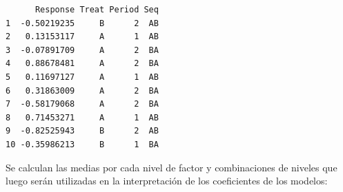 \documentclass[
  12pt,
  a4paper,
  extrafontsizes,
  onecolumn,
  openright,
  table]{memoir}
\newenvironment{Shaded}{\begin{snugshade}}{\end{snugshade}}
\newcommand{\AttributeTok}[1]{\textcolor[rgb]{0.40,0.45,0.13}{#1}}
\newcommand{\ConstantTok}[1]{\textcolor[rgb]{0.56,0.35,0.01}{#1}}
\newcommand{\DecValTok}[1]{\textcolor[rgb]{0.68,0.00,0.00}{#1}}
\newcommand{\FunctionTok}[1]{\textcolor[rgb]{0.28,0.35,0.67}{#1}}
\newcommand{\NormalTok}[1]{\textcolor[rgb]{0.00,0.23,0.31}{#1}}
\newcommand{\OtherTok}[1]{\textcolor[rgb]{0.00,0.23,0.31}{#1}}
\newcommand{\SpecialCharTok}[1]{\textcolor[rgb]{0.37,0.37,0.37}{#1}}
\newcommand{\StringTok}[1]{\textcolor[rgb]{0.13,0.47,0.30}{#1}}
\begin{document}
\begin{Shaded}
\end{Shaded}

\begin{verbatim}
      Response Treat Period Seq
1  -0.50219235     B      2  AB
2   0.13153117     A      1  AB
3  -0.07891709     A      2  BA
4   0.88678481     A      2  BA
5   0.11697127     A      1  AB
6   0.31863009     A      2  BA
7  -0.58179068     A      2  BA
8   0.71453271     A      1  AB
9  -0.82525943     B      2  AB
10 -0.35986213     B      1  BA
\end{verbatim}

\normalsize

Se calculan las medias por cada nivel de factor y combinaciones de
niveles que luego serán utilizadas en la interpretación de los
coeficientes de los modelos:
\end{document}
